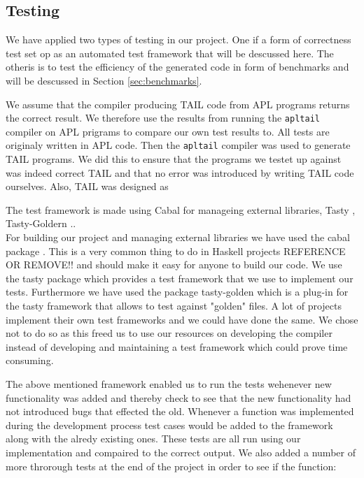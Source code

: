 \documentclass[11pt]{article}
\begin{document}
\subsection{Testing}
We have applied two types of testing in our project. One if a form of correctness test set op as an automated test
framework that will be descussed here. The otheris is to test the efficiency of the generated code in form of benchmarks and will be descussed in Section \ref{sec:benchmarks}. 


We assume that the compiler producing TAIL code from APL programs returns the correct result. We therefore use the results from running the {\tt apltail} compiler on APL prigrams to compare our own test results to. All tests are originaly written in APL code. Then the {\tt apltail} compiler was used to generate TAIL programs. We did this to ensure that the programs we testet up against was indeed correct TAIL and that no error was introduced by writing TAIL code ourselves. Also, TAIL was designed as

The test framework is made using Cabal \cite{cabal} for manageing external libraries,  Tasty  \cite{tasty}, Tasty-Goldern \cite{tasty-golden}  .. \\

For building our project and managing external libraries we have used the cabal package \cite{cabal}. This is a very common thing to
do in Haskell projects REFERENCE OR REMOVE!! and should make it easy for anyone to build our code.
We use the tasty package \cite{tasty} which provides a test framework that we use to implement our tests. Furthermore we have used the
package tasty-golden \cite{tasty-golden} which is a plug-in for the tasty framework that allows to test against "golden" files.
A lot of projects implement their own test frameworks and we could have done the same.
We chose not to do so as this freed us to use our resources on developing the compiler instead of developing and maintaining a
test framework which could prove time consuming.

The above mentioned framework enabled us to run the tests wehenever new functionality was added and thereby check to see that the new functionality had not introduced bugs that effected the old. 
Whenever a function was implemented during the development process test cases would be added to the framework along with the alredy existing ones. These tests are all run using our implementation and compaired to the correct output.
We also added a number of more throrough tests at the end of the project in order to see if the function:
\end{document}
